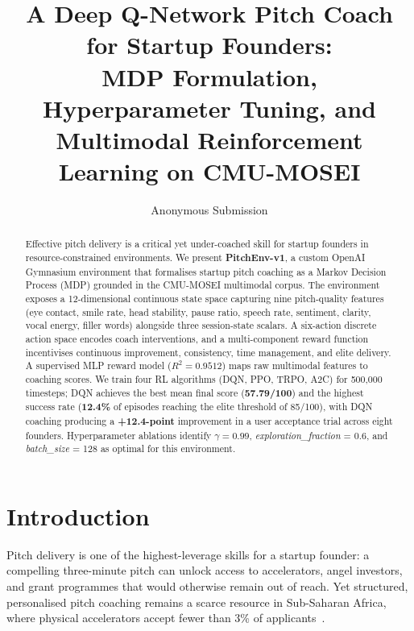 \documentclass{article}
\title{A Deep Q-Network Pitch Coach for Startup Founders:\\
       MDP Formulation, Hyperparameter Tuning, and\\
       Multimodal Reinforcement Learning on CMU-MOSEI}
\author{
    Anonymous Submission
}
\begin{document}
\maketitle


\begin{abstract}
Effective pitch delivery is a critical yet under-coached skill for startup
founders in resource-constrained environments.
We present \textbf{PitchEnv-v1}, a custom OpenAI Gymnasium environment that
formalises startup pitch coaching as a Markov Decision Process (MDP) grounded
in the CMU-MOSEI multimodal corpus.
The environment exposes a 12-dimensional continuous state space capturing
nine pitch-quality features (eye contact, smile rate, head stability,
pause ratio, speech rate, sentiment, clarity, vocal energy, filler words)
alongside three session-state scalars.
A six-action discrete action space encodes coach interventions, and a
multi-component reward function incentivises continuous improvement,
consistency, time management, and elite delivery.
A supervised MLP reward model ($R^2 = 0.9512$) maps raw multimodal features
to coaching scores. We train four RL algorithms (DQN, PPO, TRPO, A2C) for
500{,}000 timesteps; DQN achieves the best mean final score
(\textbf{57.79/100}) and the highest success rate (\textbf{12.4\%} of
episodes reaching the elite threshold of 85/100), with DQN coaching
producing a \textbf{+12.4-point} improvement in a user acceptance trial
across eight founders.
Hyperparameter ablations identify $\gamma = 0.99$,
\textit{exploration\_fraction} = 0.6, and \textit{batch\_size} = 128 as
optimal for this environment.
\end{abstract}


\FloatBarrier
\section{Introduction}

Pitch delivery is one of the highest-leverage skills for a startup founder:
a compelling three-minute pitch can unlock access to accelerators, angel
investors, and grant programmes that would otherwise remain out of reach.
Yet structured, personalised pitch coaching remains a scarce resource
in Sub-Saharan Africa, where physical accelerators accept fewer than 3\%
of applicants~\citep{gem2022africa}.
\end{document}

